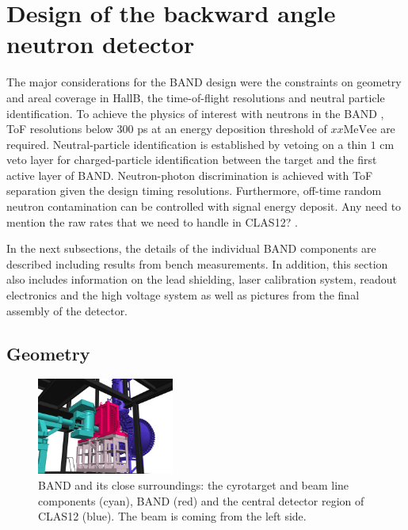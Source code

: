 \documentclass[3p,final,twocolumn]{elsarticle}
\begin{document}

\section{Design of the backward angle neutron detector}
The major considerations for the BAND design were the constraints on geometry and areal coverage in HallB, the time-of-flight resolutions and neutral particle identification.
To achieve the physics of interest with neutrons in the BAND \cite{band-proposal}, ToF resolutions below $300$ \si{\pico\second} at an energy deposition threshold of $xx \mathrm{MeVee}$ are required. Neutral-particle identification is established by vetoing on a thin $1$ \si{\centi\meter} veto layer for charged-particle identification between the target and the first active layer of BAND. Neutron-photon discrimination is achieved with ToF separation given the design 
timing resolutions. Furthermore, off-time random neutron contamination can be controlled with signal energy deposit. {\color{red} Any need to mention 
the raw rates that we need to handle in CLAS12?} .

In the next subsections, the details of the individual BAND components are described including results from bench measurements. In addition, this section also includes information on the lead shielding, laser calibration system, readout electronics and the high voltage system as well as pictures from the final assembly of the detector.


\subsection{Geometry}
\begin{figure}[tb]
	\centering
		\includegraphics[width=0.40\textwidth]{FULL_CONTEXT_STUDIE_3.png}
		\vspace{0.5cm}
		\caption{BAND and its close surroundings: the cyrotarget and beam line components (cyan),  BAND (red) and the central detector region of CLAS12 (blue). The beam is coming from the left side.}
		\label{fig:bandtarget}
		
\end{figure}
\end{document}
